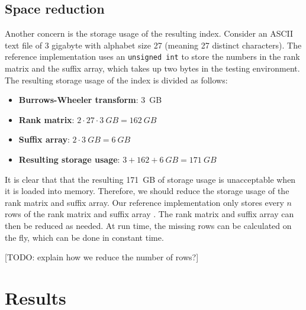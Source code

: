 \subsection{Space reduction} \label{section:space_reduction}

Another concern is the storage usage of the resulting index.
Consider an ASCII text file of 3 gigabyte with alphabet size 27 (meaning 27 distinct characters).
The reference implementation uses an \texttt{unsigned int} to store the numbers in the rank matrix and the suffix array, which takes up two bytes in the testing environment.
The resulting storage usage of the index is divided as follows:

\begin{itemize}
  \item \textbf{Burrows-Wheeler transform}: \SI{3}{GB}
  \item \textbf{Rank matrix}: $2 \cdot 27 \cdot \SI{3}{GB} = \SI{162}{GB}$
  \item \textbf{Suffix array}: $2 \cdot \SI{3}{GB} = \SI{6}{GB}$
  \item \textbf{Resulting storage usage}: $3 + 162 + \SI{6}{GB} = \SI{171}{GB}$
\end{itemize}

It is clear that that the resulting \SI{171}{GB} of storage usage is unacceptable when it is loaded into memory.
Therefore, we should reduce the storage usage of the rank matrix and suffix array.
Our reference implementation only stores every $n$ rows of the rank matrix and suffix array \cite{fernandez_string_2011,langmead_introduction_nodate}.
The rank matrix and suffix array can then be reduced as needed.
At run time, the missing rows can be calculated on the fly, which can be done in constant time.

[TODO: explain how we reduce the number of rows?]



\section{Results}

